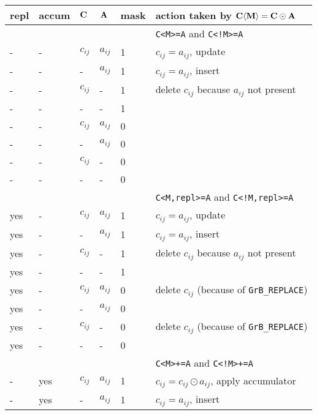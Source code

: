 \documentclass[11pt]{article}
\begin{document}
\begin{table}
{\small
\begin{tabular}{lllll|l}
\hline
repl & accum & ${\bf C}$ & ${\bf A}$ & mask & action taken by ${\bf C \langle M \rangle = C \odot A}$ \\
\hline
\hline
       &    &          &           &      & \verb'C<M>=A' and \verb'C<!M>=A' \\
\hline
    -  &-   & $c_{ij}$ & $a_{ij}$  & 1    &  $c_{ij} = a_{ij}$, update \\
    -  &-   &  -       & $a_{ij}$  & 1    &  $c_{ij} = a_{ij}$, insert \\
    -  &-   & $c_{ij}$ &  -        & 1    &  delete $c_{ij}$ because $a_{ij}$ not present \\
    -  &-   &  -       &  -        & 1    &   \\
\hline
    -  &-   & $c_{ij}$ & $a_{ij}$  & 0    &   \\
    -  &-   &  -       & $a_{ij}$  & 0    &   \\
    -  &-   & $c_{ij}$ &  -        & 0    &   \\
    -  &-   &  -       &  -        & 0    &   \\
\hline
\hline
       &    &          &           &      & \verb'C<M,repl>=A' and \verb'C<!M,repl>=A' \\
\hline
    yes&-   & $c_{ij}$ & $a_{ij}$  & 1    &  $c_{ij} = a_{ij}$, update \\
    yes&-   &  -       & $a_{ij}$  & 1    &  $c_{ij} = a_{ij}$, insert \\
    yes&-   & $c_{ij}$ &  -        & 1    &  delete $c_{ij}$ because $a_{ij}$ not present \\
    yes&-   &  -       &  -        & 1    &   \\
\hline
    yes&-   & $c_{ij}$ & $a_{ij}$  & 0    &  delete $c_{ij}$  (because of \verb'GrB_REPLACE') \\
    yes&-   &  -       & $a_{ij}$  & 0    &   \\
    yes&-   & $c_{ij}$ &  -        & 0    &  delete $c_{ij}$  (because of \verb'GrB_REPLACE') \\
    yes&-   &  -       &  -        & 0    &   \\
\hline
\hline
       &    &          &           &      & \verb'C<M>+=A' and \verb'C<!M>+=A' \\
\hline
    -  &yes & $c_{ij}$ & $a_{ij}$  & 1    &  $c_{ij} = c_{ij} \odot a_{ij}$, apply accumulator \\
    -  &yes &  -       & $a_{ij}$  & 1    &  $c_{ij} = a_{ij}$, insert \\

\end{tabular}}
\end{table}
\end{document}
